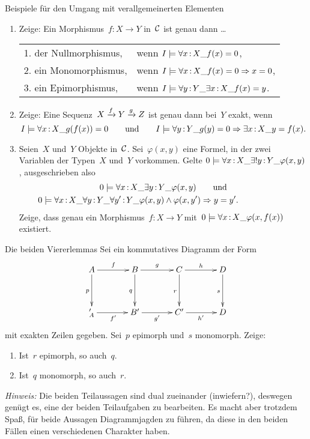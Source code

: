 \documentclass{uebblatt}
\begin{document}
\begin{aufgabe}{Beispiele für den Umgang mit verallgemeinerten Elementen}
\begin{enumerate}
\item Zeige: Ein Morphismus~$f : X \to Y$ in~$\mathcal{C}$ ist genau dann \ldots

\renewcommand{\arraystretch}{1.2}
\begin{tabular}{ll}
  1. der Nullmorphismus, & wenn
  $I \models \forall x\,{:}\,X\_ f(x) = 0$, \\
  2. ein Monomorphismus, & wenn
  $I \models \forall x\,{:}\,X\_ f(x) = 0 \Rightarrow x = 0$, \\
  3. ein Epimorphismus, & wenn
  $I \models \forall y\,{:}\,Y\_ \exists x\,{:}\,X\_ f(x) = y$.
\end{tabular}

\item Zeige: Eine Sequenz~$X \xrightarrow{f} Y \xrightarrow{g} Z$ ist genau dann bei~$Y$ exakt,
wenn
\[ I \models \forall x\,{:}\,X\_ g(f(x)) = 0
  \qquad\text{und}\qquad
  I \models \forall y\,{:}\,Y\_ g(y) = 0 \Rightarrow \exists x\,{:}\,X\_ y = f(x). \]

\item Seien~$X$ und~$Y$ Objekte in~$\mathcal{C}$. Sei~$\varphi(x,y)$ eine Formel, in der
zwei Variablen der Typen~$X$ und~$Y$ vorkommen. Gelte
$0 \models \forall x\,{:}\,X\_ \exists!y\,{:}\,Y\_ \varphi(x,y)$, ausgeschrieben also
\begin{multline*}0 \models \forall x\,{:}\,X\_ \exists y\,{:}\,Y\_ \varphi(x,y)
  \qquad\text{und} \\
  0 \models \forall x\,{:}\,X\_ \forall y\,{:}\,Y\_ \forall y'\,{:}\,Y\_ \varphi(x,y) \wedge \varphi(x,y')
  \Rightarrow y = y'. {\qquad\qquad\qquad} \end{multline*}
Zeige, dass genau ein Morphismus~$f : X \to Y$ mit~$0 \models \forall
x\,{:}\,X\_ \varphi(x,f(x))$ existiert.
\end{enumerate}
\end{aufgabe}

\newpage

\begin{aufgabe}{Die beiden Viererlemmas}
Sei ein kommutatives Diagramm der Form
\[ \xymatrixcolsep{3pc}\xymatrixrowsep{3pc}\xymatrix{
  A \ar[r]^f \ar[d]_p & B \ar[r]^g \ar[d]_q & C \ar[r]^h \ar[d]_r & D \ar[d]_s \\
_  A' \ar[r]_{f'} & B' \ar[r]_{g'} & C' \ar[r]_{h'} & D
} \]
mit exakten Zeilen gegeben. Sei~$p$ epimorph und~$s$ monomorph.
Zeige:
\begin{enumerate}
\item Ist~$r$ epimorph, so auch~$q$.
\item Ist~$q$ monomorph, so auch~$r$.
\end{enumerate}
\emph{Hinweis:} Die beiden Teilaussagen sind dual zueinander (inwiefern?),
deswegen genügt es, eine der beiden Teilaufgaben zu bearbeiten. Es macht aber
trotzdem Spaß, für beide Aussagen Diagrammjagden zu führen, da diese in den
beiden Fällen einen verschiedenen Charakter haben.
\end{aufgabe}
\end{document}
